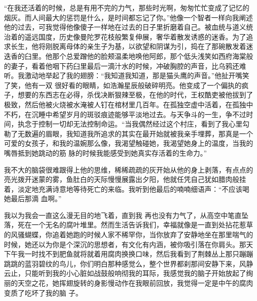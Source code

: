 \documentclass{article}
\begin{document}
“在我还活着的时候，总是有用不完的力气，那些时光啊，匆匆忙忙变成了记忆的烟灰。而人间最大的惩罚是什么，是时间都忘记了你。”他像一个智者一样向我阐述他的过去，可我觉得他像傻子一样地在过去的日子里折磨着自己。被血统与道义统治着的遥远国度，历史像曼陀罗花枝般繁复伸展，奢华着散发诱惑的迷香。为了追求长生，他将刚脱离母体的亲生子为基，以欲望和阴谋为引，捣在了那碗散发着迷迭香的臼里。他那个总爱蹭他的脸颊温柔地唤他阿郎，那个低头浅笑如西府海棠般的妻子，看着他咽下药臼里最后一滴汁水的时候，冲破胸腔的声音，比乌鸦还难听。我激动地举起了我的翅膀：“我知道我知道，那是猫头鹰的声音。”他扯开嘴笑了笑，他有一双
\newpage
很好看的眼睛，如浩瀚星辰般破碎明亮。他变成了一个偏执的疯子，想要的东西志在必得，杀伐决断狠辣至极，在他的时代，王权酷吏被他拔到了极致，然后他被火烧被水淹被人钉在棺材里几百年。在孤独空虚中活着，在孤独中不朽，在沉睡中希望岁月的斑驳痕迹能够平淡地过去。与天争斗的一生，争不过时间，执念于控制一切却无法控制命运。“当我偶然经过这个村庄，看到了我心里勾勒了无数遍的眉眼，我知道我所追求的其实在最开始就被我亲手埋葬，那真是一个可爱的女孩子，和我的温婉那么像，我渴望触碰她，我渴望她身上的温度，当我的嘴唇抵到她跳动的筋
脉的时候我能感受到她真实存活着的生命力。” 

我不大的脑袋很难跟得上他的思维，稀稀疏疏的灰开始从他的身上剥落，有点点的亮光拨开迷蒙的雾，鱼肚白的天际慢慢展露出夕阳，他就任凭自己犹如腊肉般挂着，淡定地充满诗意地等待死亡的来临。我听到他最后的喃喃细语声：“不应该喝她最后那滴
血啊。” 

我以为我会一直这么漫无目的地飞着，直到我
\newpage
再也没有力气了，从高空中笔直坠落，死在一个无名的腐叶堆里。然而生活告诉我们，幸福就像是一直到处拈花惹草的风骚蝴蝶，你追着她跑的时候人家不稀罕你，当你放弃了安静地坐在那里喘气的时候，她还以为你是个深沉的思想者，有文化有内涵，被你吸引落在你肩头。那天下午我一时找不到肥鱼就将就着用腐肉换换口味，然后我看到了荆棘丛上那只蹦蹦跳跳的蓝羽碧纹的鸟儿，你们明白那种感觉么，整个世界都刹那间安静下来，风静云止，只能听到我的小心脏如战鼓般响彻我的耳际，我感觉我的脑子开始放起了绚丽的天空之花，她挥翅旋转的身影慢动作在我眼前回放，我觉得一定是中午的腐肉变质了吃坏了我的脑
子。 
\end{document}
